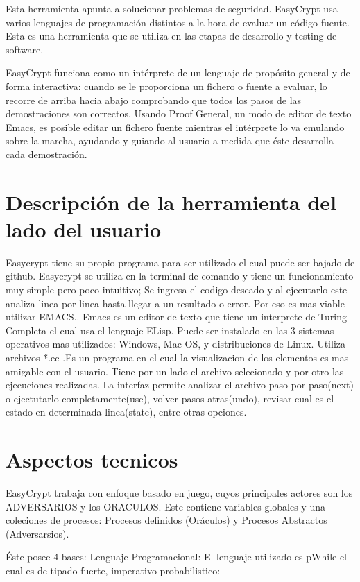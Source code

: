 \documentclass[runningheads,a4paper]{llncs}
\begin{document}
Esta herramienta apunta a solucionar problemas de seguridad. EasyCrypt usa varios lenguajes de programación distintos a la hora de evaluar un código fuente. Esta es una herramienta que se utiliza en las etapas de desarrollo y testing de software. 

EasyCrypt funciona como un intérprete de un lenguaje de propósito general y de forma interactiva: cuando se le proporciona un fichero o fuente a evaluar, lo recorre de arriba hacia abajo comprobando que todos los pasos de las demostraciones son correctos. Usando Proof General, un modo de editor de texto Emacs, es posible editar un fichero fuente mientras el intérprete lo va emulando sobre la marcha, ayudando y guiando al usuario a medida que éste desarrolla cada demostración. 

\section{Descripción de la herramienta del lado del usuario}

Easycrypt tiene su propio programa  para ser utilizado el cual puede ser bajado de github.\cite{link1}
Easycrypt se utiliza en la terminal de comando y tiene un funcionamiento muy simple pero poco intuitivo; Se ingresa el codigo deseado y al ejecutarlo este analiza linea por linea hasta llegar a un resultado o error. Por eso es mas viable utilizar EMACS.\cite{link2}. Emacs es un editor de texto que tiene un interprete de Turing Completa el cual usa el lenguaje ELisp. Puede ser instalado en las 3 sistemas operativos mas utilizados: Windows, Mac OS, y distribuciones de Linux. Utiliza archivos *.ec  .Es un programa en el cual la visualizacion de los elementos es mas amigable con el usuario. Tiene por un lado el archivo selecionado y por otro las ejecuciones realizadas. La interfaz permite analizar el archivo paso por paso(next) o ejectutarlo completamente(use), volver pasos atras(undo), revisar cual es el estado en determinada linea(state), entre otras opciones.


\section{Aspectos tecnicos}
EasyCrypt trabaja con enfoque basado en juego, cuyos principales actores son los ADVERSARIOS y los ORACULOS. Este contiene variables globales y una coleciones de procesos: Procesos definidos (Oráculos) y Procesos Abstractos (Adversarsios).

Éste posee 4 bases:
Lenguaje Programacional:
El lenguaje utilizado es pWhile el cual es de tipado fuerte, imperativo probabilistico:
\end{document}
